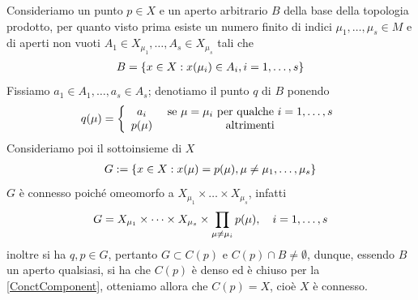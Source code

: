 \documentclass[oneside, 11pt]{amsbook}
\makeatletter
\newcommand{\0}{{(0)}}
\newcommand{\3}{{(3)}}
\theoremstyle{colonplain}
\theoremstyle{colondefinition}
\theoremstyle{colonremark}
\numberwithin{equation}{chapter}
\renewcommand{\proofname}{Dimostrazione}
\renewenvironment{proof}[1][\proofname]{\par
  \pushQED{\qed}%
  \normalfont \topsep6\p@\@plus6\p@\relax
  \trivlist
  \item[\hskip\labelsep\bfseries #1:]\ignorespaces
}{%
  \popQED\endtrivlist\@endpefalse
}
\makeatother
\begin{document}
\begin{proof}
Consideriamo un punto $p \in X$ e un aperto arbitrario $B$ della base della topologia prodotto, per quanto visto prima esiste un numero finito di indici $\mu_1, \dots, \mu_s \in M$ e di aperti non vuoti $A_1 \in X_{\mu_1}, \dots, A_s \in X_{\mu_s}$ tali che
\begin{align}
    B = \{ x \in X : x(\mu_i) \in A_i, i = 1, \dots, s \} \notag
\end{align}
Fissiamo $a_1 \in A_1, \dots, a_s \in A_s$; denotiamo il punto $q$ di $B$ ponendo
\begin{align}
    q(\mu) = \left\{ \begin{array}{cc} 
         a_i& \text{ se } \mu = \mu_i \text{ per qualche } i = 1, \dots, s  \\
         p(\mu)& \text{ altrimenti} \notag
    \end{array} \right.
\end{align}
Consideriamo poi il sottoinsieme di $X$
\begin{align}
    G := \{ x \in X : x(\mu) = p(\mu), \mu \neq \mu_1, \dots, \mu_s \} \notag
\end{align}
$G$ è connesso poiché omeomorfo a $X_{\mu_1} \times \dots \times X_{\mu_s}$, infatti
\begin{align}
    G = X_{\mu_1} \times \dots \times X_{\mu_s} \times \prod_{\mu \neq \mu_i} p(\mu), \quad i = 1, \dots, s \notag
\end{align}
inoltre si ha $q, p \in G$, pertanto $G \subset C(p)$ e $C(p) \cap B \neq \emptyset$, dunque, essendo $B$ un aperto qualsiasi, si ha che $C(p)$ è denso ed è chiuso per la \cref{ConctComponent}, otteniamo allora che $C(p) = X$, cioè $X$ è connesso.
\end{proof}
\end{document}
